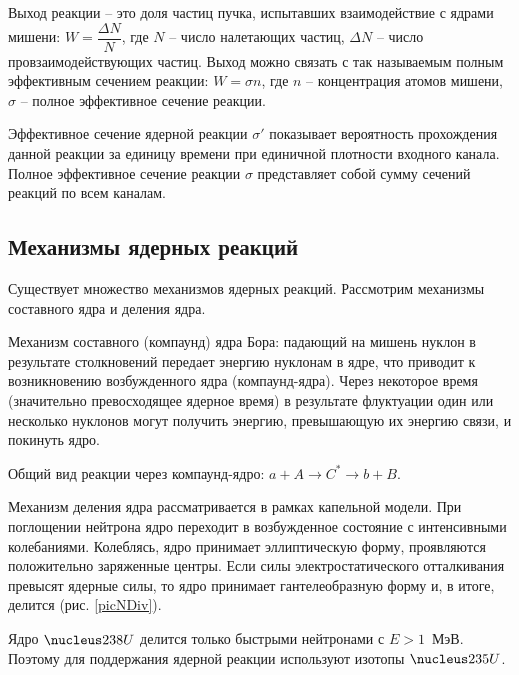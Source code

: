 Выход реакции -- это доля частиц пучка, испытавших взаимодействие с ядрами
мишени: \( W = \dfrac{\Delta N}{N} \), где \( N \) -- число налетающих частиц,
\( \Delta N \) -- число провзаимодействующих частиц. Выход можно связать с
так называемым полным эффективным сечением реакции: \( W = \sigma n \),
где \( n \) -- концентрация атомов мишени, \( \sigma \) -- полное эффективное
сечение реакции.

Эффективное сечение ядерной реакции \( \sigma' \) показывает вероятность
прохождения данной реакции за единицу времени при единичной плотности входного
канала. Полное эффективное сечение реакции \( \sigma \) представляет собой
сумму сечений реакций по всем каналам.

\subsection{Механизмы ядерных реакций}

Существует множество механизмов ядерных реакций. Рассмотрим механизмы
составного ядра и деления ядра.

Механизм составного (компаунд) ядра Бора: падающий на мишень нуклон в
результате столкновений передает энергию нуклонам в ядре, что приводит к
возникновению возбужденного ядра (компаунд-ядра). Через некоторое время
(значительно превосходящее ядерное время) в результате флуктуации один или
несколько нуклонов могут получить энергию, превышающую их энергию связи, и
покинуть ядро.

Общий вид реакции через компаунд-ядро: \( a + A \to C^* \to b + B \).

Механизм деления ядра рассматривается в рамках капельной модели. При поглощении
нейтрона ядро переходит в возбужденное состояние с интенсивными колебаниями.
Колеблясь, ядро принимает эллиптическую форму, проявляются положительно
заряженные центры. Если силы электростатического отталкивания превысят ядерные
силы, то ядро принимает гантелеобразную форму и, в итоге, делится (рис. \ref{picNDiv}).

Ядро \( \el{U}{238}{} \) делится только быстрыми нейтронами с \( E > 1 \)~МэВ.
Поэтому для поддержания ядерной реакции используют изотопы \(\el{U}{235}{}\).

